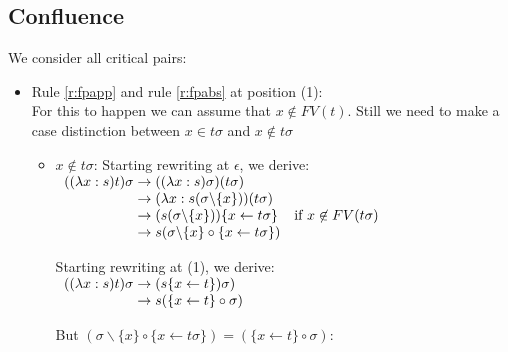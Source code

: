 \documentclass[a4paper]{article}
\newcommand{\fpsubstin}[1]{\{#1\}}
\newcommand{\fpscat}[0]{\circ}
\newcommand{\fpwith}{\leftarrow}
\newcommand{\fpwithoutset}[1]{\backslash\{#1\}}
\newcommand{\rewrites}[0]{\;\rightarrow\;}
\begin{document}
\subsection{Confluence}
\label{sec:confluence}

We consider all critical pairs:
\begin{itemize}
\item Rule \ref{r:fpapp} and rule \ref{r:fpabs} at position (1):\\
  For this to happen we can assume that $x \not \in FV(t)$. Still we need to
  make a case distinction between $x \in t\sigma$ and $x \not \in t\sigma$\\

  \begin{itemize}
  \item $x \not \in t\sigma$: Starting rewriting at $\epsilon$, we derive:\\
    $
    \begin{array}{r@{\rewrites}ll}
      ((\lambda x:s)t)\sigma & ((\lambda x:s)\sigma)(t\sigma) & \\
                             & (\lambda x : s(\sigma\fpwithoutset{x}))
                               (t\sigma) & \\
                             & (s(\sigma\fpwithoutset{x}))\fpsubstin{
                               x \fpwith t\sigma} &  \mbox{if }x \not
                                                    \in FV(t\sigma )\\
                             & s(\sigma\fpwithoutset{x} \fpscat
                               \fpsubstin{x \fpwith t\sigma}) & \\
    \end{array}
    $

    Starting rewriting at (1), we derive:\\

    $
    \begin{array}{r@{\rewrites}l}
      ((\lambda x:s)t)\sigma & (s\fpsubstin{x \fpwith t})\sigma ) \\
                             & s(\fpsubstin{x \fpwith t} \fpscat \sigma ) \\
    \end{array}
    $

    But $(\sigma\fpwithoutset{x} \fpscat \fpsubstin{x \fpwith t\sigma}) =
    (\fpsubstin{x \fpwith t} \fpscat \sigma)$:


\end{itemize}
\end{itemize}
\end{document}
